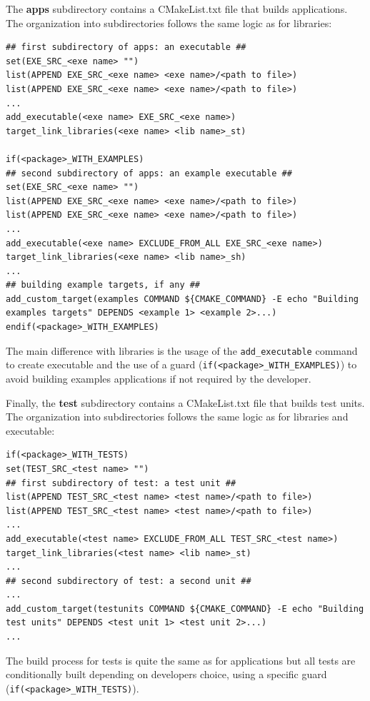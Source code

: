 \documentclass[12pt,a4paper]{article}
\begin{document}
The \textbf{apps} subdirectory contains a CMakeList.txt file that builds applications. The organization into subdirectories follows the same logic as for libraries:
\begin{verbatim}
## first subdirectory of apps: an executable ##
set(EXE_SRC_<exe name> "")
list(APPEND EXE_SRC_<exe name> <exe name>/<path to file>)
list(APPEND EXE_SRC_<exe name> <exe name>/<path to file>)
...
add_executable(<exe name> EXE_SRC_<exe name>)
target_link_libraries(<exe name> <lib name>_st)

if(<package>_WITH_EXAMPLES)
## second subdirectory of apps: an example executable ##
set(EXE_SRC_<exe name> "")
list(APPEND EXE_SRC_<exe name> <exe name>/<path to file>)
list(APPEND EXE_SRC_<exe name> <exe name>/<path to file>)
...
add_executable(<exe name> EXCLUDE_FROM_ALL EXE_SRC_<exe name>)
target_link_libraries(<exe name> <lib name>_sh)
...
## building example targets, if any ##
add_custom_target(examples COMMAND ${CMAKE_COMMAND} -E echo "Building 
examples targets" DEPENDS <example 1> <example 2>...)
endif(<package>_WITH_EXAMPLES)

\end{verbatim}
The main difference with libraries is the usage of the \verb|add_executable| command to create executable and the use of a guard (\verb|if(<package>_WITH_EXAMPLES)|) to avoid building examples applications if not required by the developer.

Finally, the \textbf{test} subdirectory contains a CMakeList.txt file that builds test units. The organization into subdirectories follows the same logic as for libraries and executable:
\begin{verbatim}
if(<package>_WITH_TESTS)
set(TEST_SRC_<test name> "")
## first subdirectory of test: a test unit ##
list(APPEND TEST_SRC_<test name> <test name>/<path to file>)
list(APPEND TEST_SRC_<test name> <test name>/<path to file>)
...
add_executable(<test name> EXCLUDE_FROM_ALL TEST_SRC_<test name>)
target_link_libraries(<test name> <lib name>_st)
...
## second subdirectory of test: a second unit ##
...
add_custom_target(testunits COMMAND ${CMAKE_COMMAND} -E echo "Building 
test units" DEPENDS <test unit 1> <test unit 2>...)
...
\end{verbatim}
The build process for tests is quite the same as for applications but all tests are conditionally built depending on developers choice, using a specific guard (\verb|if(<package>_WITH_TESTS)|). 
\end{document}
